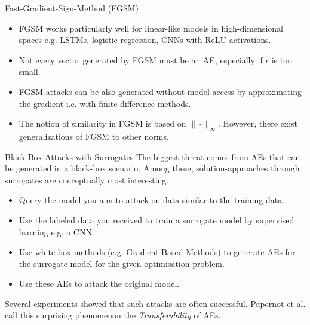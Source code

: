\documentclass[11pt,compress,t,notes=noshow, xcolor=table]{beamer}
\begin{document}
\begin{vbframe}{Fast-Gradient-Sign-Method (FGSM)}
\begin{itemize}
    \item FGSM works particularly well for linear-like models in high-dimensional spaces e.g. LSTMs, logistic regression, CNNs with ReLU activations.
    \item Not every vector generated by FGSM must be an AE, especially if $\epsilon$ is too small.
    \item FGSM-attacks can be also generated without model-access by approximating the gradient i.e. with finite difference methods.
    \item The notion of similarity in FGSM is based on $\|\cdot\|_{\infty}$. However, there exist generalizations of FGSM to other norms.
\end{itemize}
\end{vbframe}


\begin{vbframe}{Black-Box Attacks with Surrogates}
The biggest threat comes from AEs that can be generated in a black-box scenario. Among these, solution-approaches through surrogates are conceptually most interesting.
\begin{itemize}
    \item Query the model you aim to attack on data similar to the training data.
    \item Use the labeled data you received to train a surrogate model by supervised learning e.g. a CNN.
    \item Use white-box methods (e.g. Gradient-Based-Methods) to generate AEs for the surrogate model for the given optimisation problem.
    \item Use these AEs to attack the original model.
\end{itemize}
Several experiments showed that such attacks are often successful. Papernot et al. call this surprising phenomenon the \emph{Transferability} of AEs.
%
%
\end{vbframe}
\end{document}
